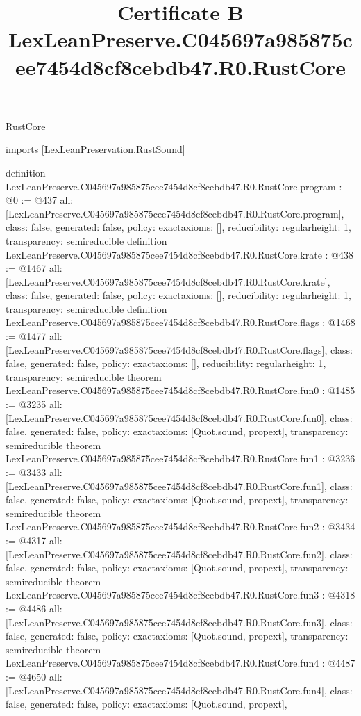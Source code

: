 \begin{lexlean}{RustCore}
\title{Certificate B LexLeanPreserve.C045697a985875cee7454d8cf8cebdb47.R0.RustCore}
\begin{coremodule}
imports [LexLeanPreservation.RustSound]

definition LexLeanPreserve.C045697a985875cee7454d8cf8cebdb47.R0.RustCore.program : @0 := @437 {
  all: [LexLeanPreserve.C045697a985875cee7454d8cf8cebdb47.R0.RustCore.program],
  class: false,
  generated: false,
  policy: exact{axioms: []},
  reducibility: regular{height: 1},
  transparency: semireducible
}
definition LexLeanPreserve.C045697a985875cee7454d8cf8cebdb47.R0.RustCore.krate : @438 := @1467 {
  all: [LexLeanPreserve.C045697a985875cee7454d8cf8cebdb47.R0.RustCore.krate],
  class: false,
  generated: false,
  policy: exact{axioms: []},
  reducibility: regular{height: 1},
  transparency: semireducible
}
definition LexLeanPreserve.C045697a985875cee7454d8cf8cebdb47.R0.RustCore.flags : @1468 := @1477 {
  all: [LexLeanPreserve.C045697a985875cee7454d8cf8cebdb47.R0.RustCore.flags],
  class: false,
  generated: false,
  policy: exact{axioms: []},
  reducibility: regular{height: 1},
  transparency: semireducible
}
theorem LexLeanPreserve.C045697a985875cee7454d8cf8cebdb47.R0.RustCore.fun0 : @1485 := @3235 {
  all: [LexLeanPreserve.C045697a985875cee7454d8cf8cebdb47.R0.RustCore.fun0],
  class: false,
  generated: false,
  policy: exact{axioms: [Quot.sound, propext]},
  transparency: semireducible
}
theorem LexLeanPreserve.C045697a985875cee7454d8cf8cebdb47.R0.RustCore.fun1 : @3236 := @3433 {
  all: [LexLeanPreserve.C045697a985875cee7454d8cf8cebdb47.R0.RustCore.fun1],
  class: false,
  generated: false,
  policy: exact{axioms: [Quot.sound, propext]},
  transparency: semireducible
}
theorem LexLeanPreserve.C045697a985875cee7454d8cf8cebdb47.R0.RustCore.fun2 : @3434 := @4317 {
  all: [LexLeanPreserve.C045697a985875cee7454d8cf8cebdb47.R0.RustCore.fun2],
  class: false,
  generated: false,
  policy: exact{axioms: [Quot.sound, propext]},
  transparency: semireducible
}
theorem LexLeanPreserve.C045697a985875cee7454d8cf8cebdb47.R0.RustCore.fun3 : @4318 := @4486 {
  all: [LexLeanPreserve.C045697a985875cee7454d8cf8cebdb47.R0.RustCore.fun3],
  class: false,
  generated: false,
  policy: exact{axioms: [Quot.sound, propext]},
  transparency: semireducible
}
theorem LexLeanPreserve.C045697a985875cee7454d8cf8cebdb47.R0.RustCore.fun4 : @4487 := @4650 {
  all: [LexLeanPreserve.C045697a985875cee7454d8cf8cebdb47.R0.RustCore.fun4],
  class: false,
  generated: false,
  policy: exact{axioms: [Quot.sound, propext]},
}
\end{coremodule}
\end{lexlean}
